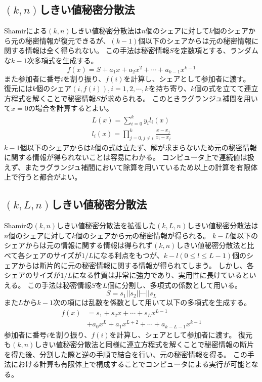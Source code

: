 \documentclass[twocolumn,a4paper]{jsarticle}
\begin{document}
	\subsection{$(k,n)$しきい値秘密分散法\cite{shamir}}
	Shamirによる$(k,n)$しきい値秘密分散法は$n$個のシェアに対して$k$個のシェアから元の秘密情報が復元できるが、$(k-1)$個以下のシェアからは元の秘密情報に関する情報は全く得られない。
	この手法は秘密情報$S$を定数項とする、ランダムな$k-1$次多項式を生成する。
	\begin{equation}
		f(x)=S+a_{1}x+a_{2}x^{2}+{\cdots}+a_{k-1}x^{k-1}
	\end{equation}
	また参加者に番号$i$を割り振り、$f(i)$を計算し、シェアとして参加者に渡す。
	復元には$k$個のシェア$(i,f(i)),i=1,2,\cdots,k$を持ち寄り、$k$個の式を立てて連立方程式を解くことで秘密情報$S$が求められる。
	このときラグランジュ補間を用いて$x=0$の場合を計算するとよい。
	\begin{align}
		L(x)={\sum_{i=0}^{k}{y_{i}l_{i}(x)}} \\
		l_{i}(x)={\prod_{j=0,j{\neq}i}^{k}{\frac{x-x_{j}}{x_{i}-x_{j}}}}
	\end{align}
	$k-1$個以下のシェアからは$k$個の式は立たず、解が求まらないため元の秘密情報に関する情報が得られないことは容易にわかる。
	コンピュータ上で連続値は扱えず、またラグランジュ補間において除算を用いているため以上の計算を有限体上で行うと都合がよい。

	\subsection{$(k,L,n)$しきい値秘密分散法\cite{yamamoto}\cite{multiparty}}
	Shamirの$(k,n)$しきい値秘密分散法を拡張した$(k,L,n)しきい値秘密分散法$は$n$個のシェアに対して$k$個のシェアから元の秘密情報が得られる。
	$k-L$個以下のシェアからは元の情報に関する情報は得られず$(k,n)$しきい値秘密分散法と比べて各シェアのサイズが$1/L$になる利点をもつが、$k-l(0{\leq}l{\leq}L-1)$個のシェアからは断片的に元の秘密情報に関する情報が得られてしまう。
	しかし、各シェアのサイズが$1/L$になる性質は非常に強力であり、実用性に長けているといえる。
	この手法は秘密情報$S$を$L$個に分割し、多項式の係数として用いる。
	\begin{equation}
		S=s_{1}||s_{2}||{\cdots}||s_{L}
	\end{equation}
	また$L$から$k-1$次の項には乱数を係数として用いて以下の多項式を生成する。
	\begin{equation}
		\begin{split}
			f(x)&=s_{1}+s_{2}x+{\cdots}+s_{L}x^{L-1} \\
			&+a_{0}x^{L}+a_{1}x^{L+2}+{\cdots}+a_{k-L-1}x^{k-1}
		\end{split}
	\end{equation}
	参加者に番号$i$を割り振り、$f(i)$を計算し、シェアとして参加者に渡す。
	復元も$(k,n)$しきい値秘密分散法と同様に連立方程式を解くことで秘密情報の断片を得た後、分割した際と逆の手順で結合を行い、元の秘密情報を得る。
	この手法における計算も有限体上で構成することでコンピュータによる実行が可能となる。
\end{document}
